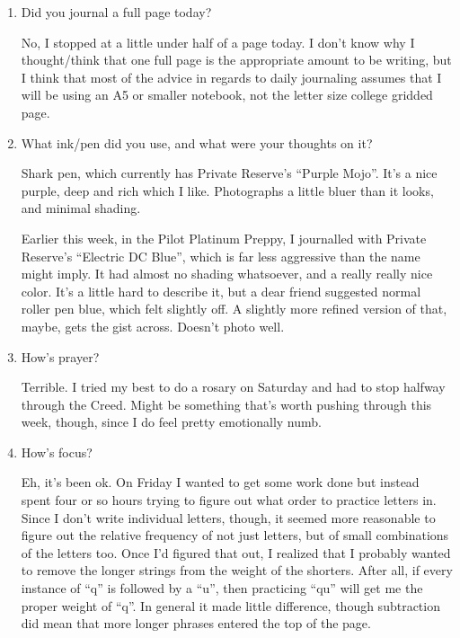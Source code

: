 \documentclass[12pt]{article}
\newcommand{\say}[1]{``#1''}
\renewcommand{\,}{\textsuperscript{,}}
\begin{document}
\begin{enumerate}

\item Did you journal a full page today?

No, I stopped at a little under half of a page today.  
I don't know why I thought/think that one full page is the appropriate amount to be writing, but I think that most of the advice in regards to daily journaling assumes that I will be using an A5 or smaller notebook, not the letter size college gridded page.

\item What ink/pen did you use, and what were your thoughts on it?

Shark pen, which currently has Private Reserve's \say{Purple Mojo}.  
It's a nice purple, deep and rich which I like. Photographs a little bluer than it looks, and minimal shading.

Earlier this week, in the Pilot Platinum Preppy, I journalled with Private Reserve's \say{Electric DC Blue}, which is far less aggressive than the name might imply.  
It had almost no shading whatsoever, and a really really nice color.  
It's a little hard to describe it, but a dear friend suggested normal roller pen blue, which felt slightly off.  
A slightly more refined version of that, maybe, gets the gist across.  
Doesn't photo well.

\item How's prayer?

Terrible. I tried my best to do a rosary on Saturday and had to stop halfway through the Creed.  
Might be something that's worth pushing through this week, though, since I do feel pretty emotionally numb.

\item How's focus?

Eh, it's been ok.  
On Friday I wanted to get some work done but instead spent four or so hours trying to figure out what order to practice letters in.  
Since I don't write individual letters, though, it seemed more reasonable to figure out the relative frequency of not just letters, but of small combinations of the letters too.  
Once I'd figured that out, I realized that I probably wanted to remove the longer strings from the weight of the shorters.  
After all, if every instance of \say{q} is followed by a \say{u}, then practicing \say{qu} will get me the proper weight of \say{q}.  
In general it made little difference, though subtraction did mean that more longer phrases entered the top of the page.


\end{enumerate}
\end{document}
